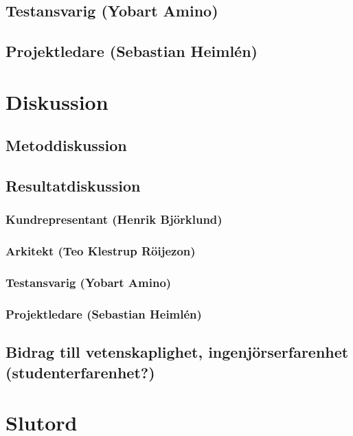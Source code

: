 \documentclass[conference,a4paper]{IEEEtran}
\begin{document}
\subsection{Testansvarig (Yobart Amino)}

\subsection{Projektledare (Sebastian Heimlén)}

\section{Diskussion} \label{sec:disk}

\subsection{Metoddiskussion}

\subsection{Resultatdiskussion}

\subsubsection{Kundrepresentant (Henrik Björklund)}

\subsubsection{Arkitekt (Teo Klestrup Röijezon)}

\subsubsection{Testansvarig (Yobart Amino)}

\subsubsection{Projektledare (Sebastian Heimlén)}

\subsection{Bidrag till vetenskaplighet, ingenjörserfarenhet (studenterfarenhet?)}

\section{Slutord} \label{sec:slutord}
\end{document}
